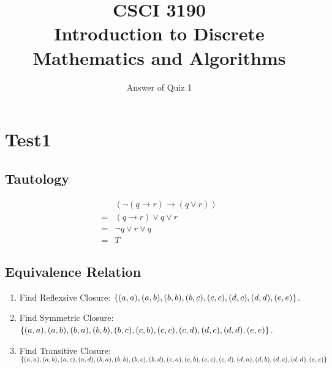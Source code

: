 \documentclass{sig-alternate-05-2015}
\begin{document}






%

\title{CSCI 3190 \\ Introduction to Discrete Mathematics and Algorithms}
\subtitle{Answer of Quiz 1}

\maketitle

\section{Test1}
\subsection{Tautology}
\begin{align}
	& (\neg (q \rightarrow r) \rightarrow (q \vee r))\\
	= & (q \rightarrow r) \vee q \vee r\\
	= & \neg q \vee r \vee q\\
	= & T
\end{align}

\subsection{Equivalence Relation}
\begin{enumerate}
	\item Find Reflexsive Closure: $\{(a, a), (a, b), (b, b), (b, c), \\(c, c), (d, c), (d, d), (e, e)\}$.
	\item Find Symmetric Closure: $\{(a, a), (a, b), (b, a), (b, b), \\(b, c), (c, b), (c, c), (c, d), (d, c), (d, d), (e, e)\}$.
	\item Find Transitive Closure: $\{(a, a), (a, b), (a, c), (a, d), \\(b, a), (b, b), (b, c), (b, d), (c, a), (c, b), (c, c), (c, d), (d, a), \\(d, b), (d, c), (d, d), (e, e)\}$
\end{enumerate}
\end{document}
